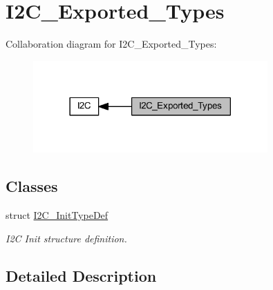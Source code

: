 \hypertarget{group___i2_c___exported___types}{}\section{I2\+C\+\_\+\+Exported\+\_\+\+Types}
\label{group___i2_c___exported___types}
Collaboration diagram for I2\+C\+\_\+\+Exported\+\_\+\+Types\+:
\nopagebreak
\begin{figure}[H]
\begin{center}
\leavevmode
\includegraphics[width=254pt]{group___i2_c___exported___types}
\end{center}
\end{figure}
\subsection*{Classes}
\begin{DoxyCompactItemize}
\item 
struct \hyperlink{struct_i2_c___init_type_def}{I2\+C\+\_\+\+Init\+Type\+Def}
\begin{DoxyCompactList}\small\item\em I2C Init structure definition. \end{DoxyCompactList}\end{DoxyCompactItemize}


\subsection{Detailed Description}
